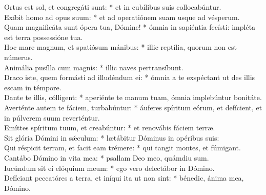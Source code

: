 {	Ortus est sol, et congregáti sunt: * et in cubílibus suis collocabúntur. \\
	Exíbit homo ad opus suum: * et ad operatiónem suam usque ad vésperum. \\
	Quam magnificáta sunt ópera tua, Dómine! * ómnia in sapiéntia fecísti: impléta est terra possessióne tua. \\
	Hoc mare magnum, et spatiósum mánibus: * illic reptília, quorum non est númerus. \\
	Animália pusílla cum magnis: * illic naves pertransíbunt. \\
	Draco iste, quem formásti ad illudéndum ei: * ómnia a te exspéctant ut des illis escam in témpore. \\
	Dante te illis, cólligent: * aperiénte te manum tuam, ómnia implebúntur bonitáte. \\
	Averténte autem te fáciem, turbabúntur: * áuferes spíritum eórum, et defícient, et in púlverem suum reverténtur. \\
	Emíttes spíritum tuum, et creabúntur: * et renovábis fáciem terræ. \\
	Sit glória Dómini in sǽculum: * lætábitur Dóminus in opéribus suis: \\
	Qui réspicit terram, et facit eam trémere: * qui tangit montes, et fúmigant. \\
	Cantábo Dómino in vita mea: * psallam Deo meo, quámdiu sum. \\
	Iucúndum sit ei elóquium meum: * ego vero delectábor in Dómino. \\
	Defíciant peccatóres a terra, et iníqui ita ut non sint: * bénedic, ánima mea, Dómino.
}

